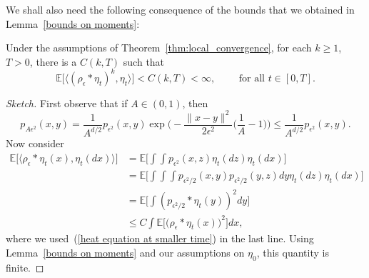 \documentclass[EJP]{ejpecp} %
\newcommand{\IE}{\mathbb E}
\begin{document}
We shall also need the following consequence of the bounds that we obtained in 
Lemma~\ref{bounds on moments}:
\begin{corollary}
\label{alternative form moment bounds}
Under the assumptions of Theorem~\ref{thm:local_convergence},
for each $k\geq 1$, $T>0$, there is a $C(k,T)$ such that
\begin{equation}
\label{double integrals with respect to eta}
\IE\Big[\big\langle (\rho_\epsilon*\eta_t)^{k},\eta_t\big\rangle \Big]
<C(k,T)<\infty, \qquad\mbox{ for all }t\in [0,T].
\end{equation}
\end{corollary}
\begin{proof}[Sketch]
First observe that if $A\in (0,1)$, then 
\begin{equation}
\label{heat equation at smaller time}
p_{A\epsilon^2}(x,y)
=\frac{1}{A^{d/2}}p_{\epsilon^2}(x,y)\exp\Big(-\frac{\|x-y\|^2}{2\epsilon^2}
\big(\frac{1}{A}-1\big)\Big)\leq \frac{1}{A^{d/2}}p_{\epsilon^2}(x,y).
\end{equation}
Now consider
    \begin{align*}
\IE\big[\langle \rho_\epsilon*\eta_t(x),\eta_t(dx)\rangle\big]&=
\IE\Big[\int\int p_{\epsilon^2}(x,z)\eta_t(dz)\eta_t(dx)\Big]
\\        
&=
\IE\Big[\int\int\int p_{\epsilon^2/2}(x,y) 
p_{\epsilon^2/2}(y,z)dy\eta_t(dz)\eta_t(dx)\Big]
        \\ &=
       \IE\Big[ \int \left( p_{\epsilon^2/2} * \eta_t(y) \right)^2 dy \Big]
\\&\leq C\int \IE\big[\big(\rho_\epsilon*\eta_t(x)\big)^2\big] dx,
    \end{align*}
where we used~(\ref{heat equation at smaller time}) in the last line.
Using Lemma~\ref{bounds on moments}
and our assumptions on $\eta_0$, this quantity is finite.


\end{proof}
\end{document}
